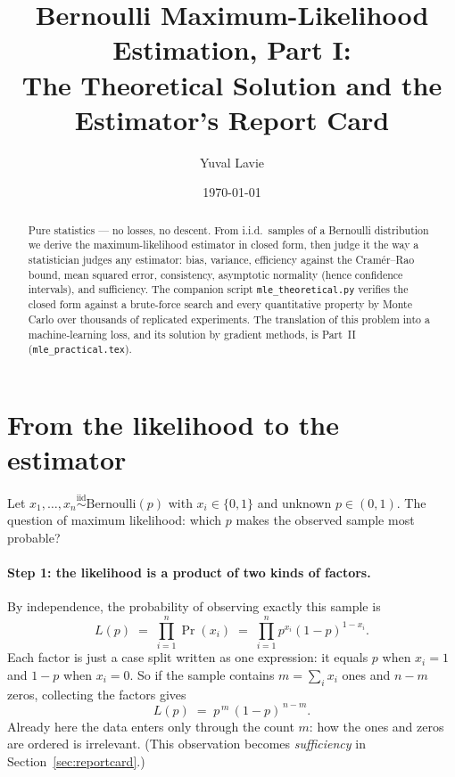 \documentclass[11pt]{article}
\title{Bernoulli Maximum-Likelihood Estimation, Part I:\\
The Theoretical Solution and the Estimator's Report Card}
\author{Yuval Lavie}
\date{\today}
\begin{document}
\maketitle

\begin{abstract}
Pure statistics --- no losses, no descent. From i.i.d.\ samples of a
Bernoulli distribution we derive the maximum-likelihood estimator in
closed form, then judge it the way a statistician judges any estimator:
bias, variance, efficiency against the Cram\'er--Rao bound, mean squared
error, consistency, asymptotic normality (hence confidence intervals),
and sufficiency. The companion script \texttt{mle\_theoretical.py}
verifies the closed form against a brute-force search and every
quantitative property by Monte Carlo over thousands of replicated
experiments. The translation of this problem into a machine-learning
loss, and its solution by gradient methods, is Part~II
(\texttt{mle\_practical.tex}).
\end{abstract}

\section{From the likelihood to the estimator}

Let $x_1,\dots,x_n \overset{\text{iid}}{\sim} \mathrm{Bernoulli}(p)$ with
$x_i \in \{0,1\}$ and unknown $p \in (0,1)$. The question of maximum
likelihood: which $p$ makes the observed sample most probable?

\paragraph{Step 1: the likelihood is a product of two kinds of factors.}
By independence, the probability of observing exactly this sample is
\begin{equation}
  L(p) \;=\; \prod_{i=1}^{n} \Pr(x_i)
       \;=\; \prod_{i=1}^{n} p^{x_i}(1-p)^{1-x_i}.
\end{equation}
Each factor is just a case split written as one expression: it equals $p$
when $x_i = 1$ and $1-p$ when $x_i = 0$. So if the sample contains
$m = \sum_i x_i$ ones and $n - m$ zeros, collecting the factors gives
\begin{equation}
  L(p) \;=\; p^{\,m}\,(1-p)^{\,n-m}.
  \label{eq:likelihood}
\end{equation}
Already here the data enters only through the count $m$: how the ones and
zeros are ordered is irrelevant. (This observation becomes
\emph{sufficiency} in Section~\ref{sec:reportcard}.)
\end{document}
